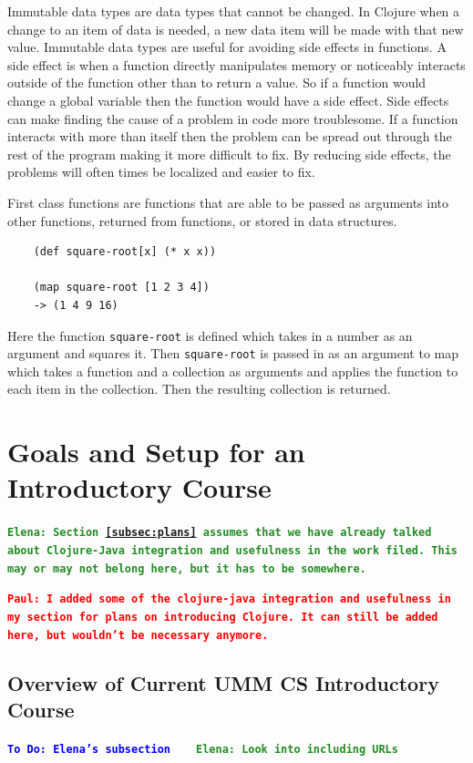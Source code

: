 \documentclass[12pt]{article}
\newcommand{\comment}[1]{{\bf \tt  {#1}}}
\newcommand{\emcomment}[1]{\textcolor{ForestGreen}{\comment{Elena: {#1}}}}
\newcommand{\todo}[1]{\textcolor{blue}{\comment{To Do: {#1}}}}
\newcommand{\pscomment}[1]{\textcolor{red}{\comment{Paul: {#1}}}}
\begin{document}
Immutable data types are data types that cannot be changed. In Clojure when a change to an item of data is needed, a new data item will be made with that new value. Immutable data types are useful for avoiding side effects in functions. A side effect is when a function directly manipulates memory or noticeably interacts outside of the function other than to return a value. So if a function would change a global variable then the function would have a side effect. Side effects can make finding the cause of a problem in code more troublesome. If a function interacts with more than itself then the problem can be spread out through the rest of the program making it more difficult to fix. By reducing side effects, the problems will often times be localized and easier to fix. 

First class functions are functions that are able to be passed as arguments into other functions, returned from functions, or stored in data structures.
\begin{verbatim}
	(def square-root[x] (* x x))
	
	(map square-root [1 2 3 4])
	-> (1 4 9 16)
\end{verbatim}
Here the function \texttt{square-root} is defined which takes in a number as an argument and squares it. Then \texttt{square-root} is passed in as an argument to map which takes a function and a collection as arguments and applies the function to each item in the collection. Then the resulting collection is returned.   

\section{Goals and Setup for an Introductory Course}\label{sec:racket-clojure}
\emcomment{Section~\ref{subsec:plans} assumes that we have already talked about Clojure-Java integration and usefulness in the work filed. This may or may not belong here, but it has to be somewhere.}

\pscomment{I added some of the clojure-java integration and usefulness in my section for plans on introducing Clojure.  It can still be added here, but wouldn't be necessary anymore.}

\subsection{Overview of Current UMM CS Introductory Course}\label{subsec:course}
\todo{Elena's subsection}
~\cite{htdp}
~\cite{lein} \emcomment{Look into including URLs}
\end{document}
